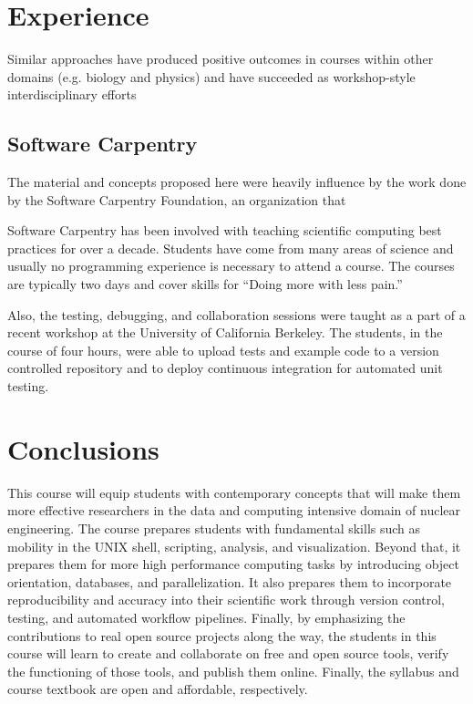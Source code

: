 \documentclass{anstrans}
\begin{document}
\section{Experience}

Similar approaches have produced positive outcomes in courses within other domains
(e.g. biology 
\cite{matthews_using_2010,honts_evolving_2003,tjaden_multidisciplinary_2007,libeskind-hadas_first_2013} 
and physics\cite{baxter_scientific_2014,myers_python_2007}) and have succeeded 
as workshop-style interdisciplinary efforts 
\cite{huff_rapid_2011,wilson_software_2006,wilson_software_2014}

\subsection{Software Carpentry}

The material and concepts proposed here were heavily influence by the work done
by the Software Carpentry Foundation, an organization that

Software Carpentry has been involved with teaching scientific computing best
practices for over a decade. Students have come from many areas of science and
usually no programming experience is necessary to attend a course. The courses
are typically two days and cover skills for ``Doing more with less pain.''

Also, the testing, debugging, and collaboration sessions were taught as a part
of a recent workshop at the University of California Berkeley. The students, in
the course of four hours, were able to upload tests and example code to a
version controlled repository and to deploy continuous integration for
automated unit testing.

\section{Conclusions}

This course will equip students with contemporary concepts that will make them more
effective researchers in the data and computing intensive domain of nuclear
engineering. The course prepares students with fundamental skills such
as mobility in the UNIX shell, scripting, analysis, and visualization. Beyond
that, it prepares them for more high performance computing tasks by introducing
object orientation, databases, and parallelization. It also prepares them to
incorporate reproducibility and accuracy into their scientific work through
version control, testing, and automated workflow pipelines.  Finally, by
emphasizing the contributions to real open source projects along the way, the
students in this course will learn to create and collaborate on free and open
source tools, verify the functioning of those tools, and publish them online.
Finally, the syllabus and course textbook are open and affordable,
respectively.
\end{document}
